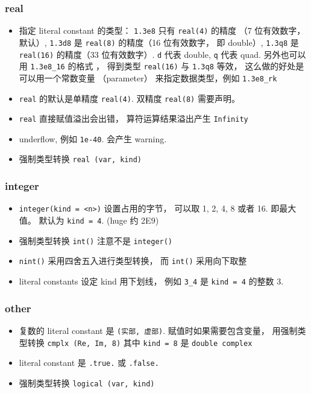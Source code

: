 \subsubsection{real}
\begin{itemize}
\item 指定 literal constant 的类型： \verb`1.3e8` 只有 \verb`real(4)` 的精度 （7 位有效数字， 默认）, \verb`1.3d8` 是 \verb`real(8)` 的精度（16 位有效数字， 即 double）, \verb`1.3q8` 是 \verb`real(16)` 的精度（33 位有效数字）. \verb`d` 代表 double, \verb`q` 代表 quad. 另外也可以用 \verb`1.3e8_16` 的格式 ， 得到类型  \verb`real(16)` 与 \verb`1.3q8` 等效， 这么做的好处是可以用一个常数变量 （parameter） 来指定数据类型，例如 \verb`1.3e8_rk`
\item \verb`real` 的默认是单精度 \verb`real(4)`. 双精度 \verb`real(8)` 需要声明。
\item \verb`real` 直接赋值溢出会出错， 算符运算结果溢出产生 \verb`Infinity`
\item underflow, 例如 \verb`1e-40`. 会产生 warning.
\item 强制类型转换 \verb`real (var, kind)`
\end{itemize}

\subsubsection{integer}
\begin{itemize}
\item \verb`integer(kind = <n>)` 设置占用的字节， 可以取 1, 2, 4, 8 或者 16. 即最大值。 默认为 
   \verb`kind = 4`. (huge 约 2E9)
\item 强制类型转换 \verb`int()` 注意不是 \verb`integer()`
\item \verb`nint()` 采用四舍五入进行类型转换， 而 \verb`int()` 采用向下取整
\item literal constants 设定 kind 用下划线， 例如 \verb`3_4` 是 \verb`kind = 4` 的整数 3.
\end{itemize}

\subsubsection{other}
\begin{itemize}
\item 复数的 literal constant 是 \verb`(实部, 虚部)`. 赋值时如果需要包含变量， 用强制类型转换 \verb`cmplx (Re, Im, 8)` 其中 \verb`kind = 8` 是 \verb`double complex`
\item literal constant 是 \verb`.true.` 或 \verb`.false.`
\item 强制类型转换 \verb`logical (var, kind)`
\end{itemize}

